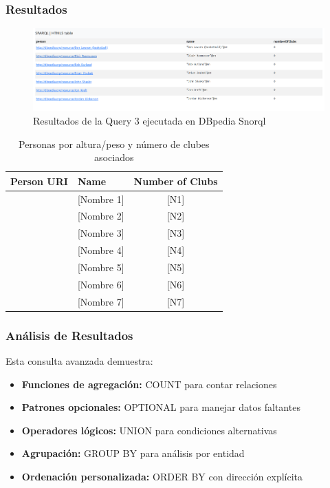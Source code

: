 \documentclass[12pt,a4paper]{article}
\begin{document}
\subsubsection{Resultados}

\begin{figure}[H]
    \centering
    \includegraphics[width=\textwidth]{screenshots/Query3.png}
    \caption{Resultados de la Query 3 ejecutada en DBpedia Snorql}
    \label{fig:query3_results}
\end{figure}

\begin{table}[H]
    \centering
    \caption{Personas por altura/peso y número de clubes asociados}
    \label{tab:query3_results}
    \begin{tabular}{|l|l|c|}
        \hline
        \textbf{Person URI} & \textbf{Name} & \textbf{Number of Clubs} \\
        \hline
        [URI 1] & [Nombre 1] & [N1] \\
        [URI 2] & [Nombre 2] & [N2] \\
        [URI 3] & [Nombre 3] & [N3] \\
        [URI 4] & [Nombre 4] & [N4] \\
        [URI 5] & [Nombre 5] & [N5] \\
        [URI 6] & [Nombre 6] & [N6] \\
        [URI 7] & [Nombre 7] & [N7] \\
        \hline
    \end{tabular}
\end{table}

\subsubsection{Análisis de Resultados}

Esta consulta avanzada demuestra:

\begin{itemize}
    \item \textbf{Funciones de agregación:} COUNT para contar relaciones
    \item \textbf{Patrones opcionales:} OPTIONAL para manejar datos faltantes
    \item \textbf{Operadores lógicos:} UNION para condiciones alternativas
    \item \textbf{Agrupación:} GROUP BY para análisis por entidad
    \item \textbf{Ordenación personalizada:} ORDER BY con dirección explícita
\end{itemize}
\end{document}

